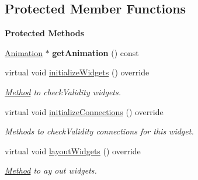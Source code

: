 \subsection*{Protected Member Functions}
\begin{Indent}\textbf{ Protected Methods}\par
\begin{DoxyCompactItemize}
\item 
\mbox{\label{classrev_1_1_view_1_1_anim_clip_widget_a0d7d10856c3f665f74b8233c9d9f67b1}} 
\mbox{\hyperlink{classrev_1_1_animation}{Animation}} $\ast$ {\bfseries get\+Animation} () const
\item 
\mbox{\label{classrev_1_1_view_1_1_anim_clip_widget_a6e7a33ecf2755f0782801a52c8e3add6}} 
virtual void \mbox{\hyperlink{classrev_1_1_view_1_1_anim_clip_widget_a6e7a33ecf2755f0782801a52c8e3add6}{initialize\+Widgets}} () override
\begin{DoxyCompactList}\small\item\em \mbox{\hyperlink{struct_method}{Method}} to check\+Validity widgets. \end{DoxyCompactList}\item 
\mbox{\label{classrev_1_1_view_1_1_anim_clip_widget_a6aba231f174cbd9d7813db75e7212bd3}} 
virtual void \mbox{\hyperlink{classrev_1_1_view_1_1_anim_clip_widget_a6aba231f174cbd9d7813db75e7212bd3}{initialize\+Connections}} () override
\begin{DoxyCompactList}\small\item\em Methods to check\+Validity connections for this widget. \end{DoxyCompactList}\item 
\mbox{\label{classrev_1_1_view_1_1_anim_clip_widget_a2d7f7f56c4dd4146b80cca09b6e33458}} 
virtual void \mbox{\hyperlink{classrev_1_1_view_1_1_anim_clip_widget_a2d7f7f56c4dd4146b80cca09b6e33458}{layout\+Widgets}} () override
\begin{DoxyCompactList}\small\item\em \mbox{\hyperlink{struct_method}{Method}} to ay out widgets. \end{DoxyCompactList}\end{DoxyCompactItemize}
\end{Indent}
